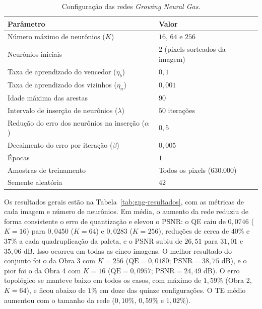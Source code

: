\documentclass[11pt,a4paper]{article}
\begin{document}
\begin{table}[htbp]
  \centering
  \small
  \begin{tabular}{ll}
    \toprule
    Parâmetro & Valor \\
    \midrule
    Número máximo de neurônios ($K$) & $16$, $64$ e $256$ \\
    Neurônios iniciais & $2$ (pixels sorteados da imagem) \\
    Taxa de aprendizado do vencedor ($\eta_b$) & $0{,}1$ \\
    Taxa de aprendizado dos vizinhos ($\eta_n$) & $0{,}001$ \\
    Idade máxima das arestas & $90$ \\
    Intervalo de inserção de neurônios ($\lambda$) & $50$ iterações \\
    Redução do erro dos neurônios na inserção ($\alpha$) & $0{,}5$ \\
    Decaimento do erro por iteração ($\beta$) & $0{,}005$ \\
    Épocas & $1$ \\
    Amostras de treinamento & Todos os pixels ($630.000$) \\
    Semente aleatória & $42$ \\
    \bottomrule
  \end{tabular}
  \caption{Configuração das redes \textit{Growing Neural Gas}.}
  \label{tab:gng-config}
\end{table}

Os resultados gerais estão na Tabela~\ref{tab:gng-resultados}, com as métricas de
cada imagem e número de neurônios. Em média, o aumento da rede reduziu de forma
consistente o erro de quantização e elevou o PSNR: o QE caiu de $0{,}0746$
($K = 16$) para $0{,}0450$ ($K = 64$) e $0{,}0283$ ($K = 256$), reduções de cerca
de $40\%$ e $37\%$ a cada quadruplicação da paleta, e o PSNR subiu de $26{,}51$
para $31{,}01$ e $35{,}06$ dB. Isso ocorreu em todas as cinco imagens. O melhor
resultado do conjunto foi o da Obra 3 com $K = 256$ ($\mathrm{QE} = 0{,}0180$;
$\mathrm{PSNR} = 38{,}75$ dB), e o pior foi o da Obra 4 com $K = 16$
($\mathrm{QE} = 0{,}0957$; $\mathrm{PSNR} = 24{,}49$ dB). O erro topológico se
manteve baixo em todos os casos, com máximo de $1{,}59\%$ (Obra 2, $K = 64$), e
ficou abaixo de $1\%$ em doze das quinze configurações. O TE médio aumentou com o
tamanho da rede ($0{,}10\%$, $0{,}59\%$ e $1{,}02\%$).
\end{document}
